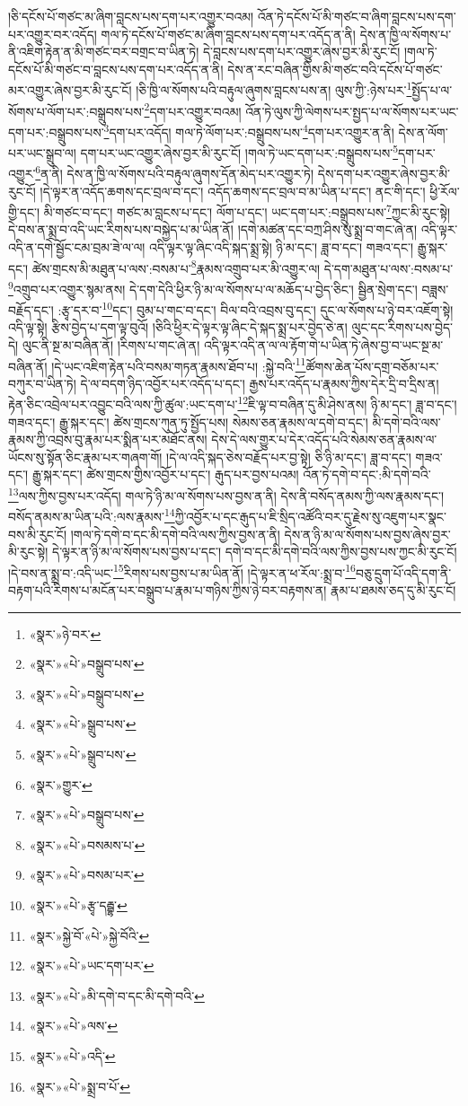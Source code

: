 །ཅི་དངོས་པོ་གཙང་མ་ཞིག་བླངས་པས་དག་པར་འགྱུར་བའམ། འོན་ཏེ་དངོས་པོ་མི་གཙང་བ་ཞིག་བླངས་པས་དག་པར་འགྱུར་བར་འདོད། གལ་ཏེ་དངོས་པོ་གཙང་མ་ཞིག་བླངས་པས་དག་པར་འདོད་ན་ནི། དེས་ན་ཁྱི་ལ་སོགས་པ་ནི་འཇིག་རྟེན་ན་མི་གཙང་བར་བགྲང་བ་ཡིན་ཏེ། དེ་བླངས་པས་དག་པར་འགྱུར་ཞེས་བྱར་མི་རུང་ངོ། །གལ་ཏེ་དངོས་པོ་མི་གཙང་བ་བླངས་པས་དག་པར་འདོད་ན་ནི། དེས་ན་རང་བཞིན་གྱིས་མི་གཙང་བའི་དངོས་པོ་གཙང་མར་འགྱུར་ཞེས་བྱར་མི་རུང་ངོ། །ཅི་ཁྱི་ལ་སོགས་པའི་བརྟུལ་ཞུགས་བླངས་པས་ན། ལུས་ཀྱི་:ཉེས་པར་\footnote{«སྣར་»ཉེ་བར་}སྤྱོད་པ་ལ་སོགས་པ་ལོག་པར་:བསྒྲུབས་པས་\footnote{«སྣར་»«པེ་»བསྒྲུབ་པས་}དག་པར་འགྱུར་བའམ། འོན་ཏེ་ལུས་ཀྱི་ལེགས་པར་སྤྱད་པ་ལ་སོགས་པར་ཡང་དག་པར་:བསྒྲུབས་པས་\footnote{«སྣར་»«པེ་»བསྒྲུབ་པས་}དག་པར་འདོད། གལ་ཏེ་ལོག་པར་:བསྒྲུབས་པས་\footnote{«སྣར་»«པེ་»སྒྲུབ་པས་}དག་པར་འགྱུར་ན་ནི། དེས་ན་ལོག་པར་ཡང་སྒྲུབ་ལ། དག་པར་ཡང་འགྱུར་ཞེས་བྱར་མི་རུང་ངོ། །གལ་ཏེ་ཡང་དག་པར་:བསྒྲུབས་པས་\footnote{«སྣར་»«པེ་»སྒྲུབ་པས་}དག་པར་འགྱུར་\footnote{«སྣར་»གྱུར་}ན་ནི། དེས་ན་ཁྱི་ལ་སོགས་པའི་བརྟུལ་ཞུགས་དོན་མེད་པར་འགྱུར་ཏེ། དེས་དག་པར་འགྱུར་ཞེས་བྱར་མི་རུང་ངོ། །དེ་ལྟར་ན་འདོད་ཆགས་དང་བྲལ་བ་དང་། འདོད་ཆགས་དང་བྲལ་བ་མ་ཡིན་པ་དང་། ནང་གི་དང་། ཕྱི་རོལ་གྱི་དང་། མི་གཙང་བ་དང་། གཙང་མ་བླངས་པ་དང་། ལོག་པ་དང་། ཡང་དག་པར་:བསྒྲུབས་པས་\footnote{«སྣར་»«པེ་»བསྒྲུབ་པས་}ཀྱང་མི་རུང་སྟེ། དེ་བས་ན་སྨྲ་བ་འདི་ཡང་རིགས་པས་བསྐྱེད་པ་མ་ཡིན་ནོ། །དགེ་མཚན་དང་བཀྲ་ཤིས་སུ་སྨྲ་བ་གང་ཞེ་ན། འདི་ལྟར་འདི་ན་དགེ་སྦྱོང་ངམ་བྲམ་ཟེ་ལ་ལ། འདི་ལྟར་ལྟ་ཞིང་འདི་སྐད་སྨྲ་སྟེ། ཉི་མ་དང་། ཟླ་བ་དང་། གཟའ་དང་། རྒྱུ་སྐར་དང་། ཚེས་གྲངས་མི་མཐུན་པ་ལས་:བསམ་པ་\footnote{«སྣར་»«པེ་»བསམས་པ་}རྣམས་འགྲུབ་པར་མི་འགྱུར་ལ། དེ་དག་མཐུན་པ་ལས་:བསམ་པ་\footnote{«སྣར་»«པེ་»བསམ་པར་}འགྲུབ་པར་འགྱུར་སྙམ་ནས། དེ་དག་དེའི་ཕྱིར་ཉི་མ་ལ་སོགས་པ་ལ་མཆོད་པ་བྱེད་ཅིང་། སྦྱིན་སྲེག་དང་། བཟླས་བརྗོད་དང་། :རྩྭ་དར་བ་\footnote{«སྣར་»«པེ་»རྩྭ་དརྦྷ་}དང་། བུམ་པ་གང་བ་དང་། བིལ་བའི་འབྲས་བུ་དང་། དུང་ལ་སོགས་པ་ཉེ་བར་འཇོག་སྟེ། འདི་ལྟ་སྟེ། རྩིས་བྱེད་པ་དག་ལྟ་བུའོ། །ཅིའི་ཕྱིར་དེ་ལྟར་ལྟ་ཞིང་དེ་སྐད་སྨྲ་པར་བྱེད་ཅེ་ན། ལུང་དང་རིགས་པས་བྱེད་དེ། ལུང་ནི་སྔ་མ་བཞིན་ནོ། །རིགས་པ་གང་ཞེ་ན། འདི་ལྟར་འདི་ན་ལ་ལ་རྟོག་གེ་པ་ཡིན་ཏེ་ཞེས་བྱ་བ་ཡང་སྔ་མ་བཞིན་ནོ། །དེ་ཡང་འཇིག་རྟེན་པའི་བསམ་གཏན་རྣམས་ཐོབ་པ། :སྐྱེ་བའི་\footnote{«སྣར་»སྐྱེ་བོ་«པེ་»སྐྱེ་བོའི་}ཚོགས་ཆེན་པོས་དགྲ་བཅོམ་པར་བཀུར་བ་ཡིན་ཏེ། དེ་ལ་བདག་ཉིད་འབྱོར་པར་འདོད་པ་དང་། རྒྱས་པར་འདོད་པ་རྣམས་ཀྱིས་དེར་དྲི་བ་དྲིས་ན། རྟེན་ཅིང་འབྲེལ་པར་འབྱུང་བའི་ལས་ཀྱི་ཚུལ་:ཡང་དག་པ་\footnote{«སྣར་»«པེ་»ཡང་དག་པར་}ཇི་ལྟ་བ་བཞིན་དུ་མི་ཤེས་ནས། ཉི་མ་དང་། ཟླ་བ་དང་། གཟའ་དང་། རྒྱུ་སྐར་དང་། ཚེས་གྲངས་ཀུན་ཏུ་སྤྱོད་པས། སེམས་ཅན་རྣམས་ལ་དགེ་བ་དང་། མི་དགེ་བའི་ལས་རྣམས་ཀྱི་འབྲས་བུ་རྣམ་པར་སྨིན་པར་མཐོང་ནས། དེས་དེ་ལས་གྱུར་པ་དེར་འདོད་པའི་སེམས་ཅན་རྣམས་ལ་ཡོངས་སུ་སྟོན་ཅིང་རྣམ་པར་གཞག་གོ། །དེ་ལ་འདི་སྐད་ཅེས་བརྗོད་པར་བྱ་སྟེ། ཅི་ཉི་མ་དང་། ཟླ་བ་དང་། གཟའ་དང་། རྒྱུ་སྐར་དང་། ཚེས་གྲངས་གྱིས་འབྱོར་པ་དང་། རྒུད་པར་བྱས་པའམ། འོན་ཏེ་དགེ་བ་དང་:མི་དགེ་བའི་\footnote{«སྣར་»«པེ་»མི་དགེ་བ་དང་མི་དགེ་བའི་}ལས་ཀྱིས་བྱས་པར་འདོད། གལ་ཏེ་ཉི་མ་ལ་སོགས་པས་བྱས་ན་ནི། དེས་ནི་བསོད་ནམས་ཀྱི་ལས་རྣམས་དང་། བསོད་ནམས་མ་ཡིན་པའི་:ལས་རྣམས་\footnote{«སྣར་»«པེ་»ལས་}ཀྱི་འབྱོར་པ་དང་རྒུད་པ་ཇི་སྲིད་འཚོའི་བར་དུ་རྗེས་སུ་འཇུག་པར་སྣང་བས་མི་རུང་ངོ། །གལ་ཏེ་དགེ་བ་དང་མི་དགེ་བའི་ལས་ཀྱིས་བྱས་ན་ནི། དེས་ན་ཉི་མ་ལ་སོགས་པས་བྱས་ཞེས་བྱར་མི་རུང་སྟེ། དེ་ལྟར་ན་ཉི་མ་ལ་སོགས་པས་བྱས་པ་དང་། དགེ་བ་དང་མི་དགེ་བའི་ལས་ཀྱིས་བྱས་པས་ཀྱང་མི་རུང་ངོ། །དེ་བས་ན་སྨྲ་བ་:འདི་ཡང་\footnote{«སྣར་»«པེ་»འདི་}རིགས་པས་བྱས་པ་མ་ཡིན་ནོ། །དེ་ལྟར་ན་ཕ་རོལ་:སྨྲ་བ་\footnote{«སྣར་»«པེ་»སྨྲ་བ་པོ་}བཅུ་དྲུག་པོ་འདི་དག་ནི་བརྟག་པའི་རིགས་པ་མངོན་པར་བསྒྲུབ་པ་རྣམ་པ་གཉིས་ཀྱིས་ཉེ་བར་བརྟགས་ན། རྣམ་པ་ཐམས་ཅད་དུ་མི་རུང་ངོ། 